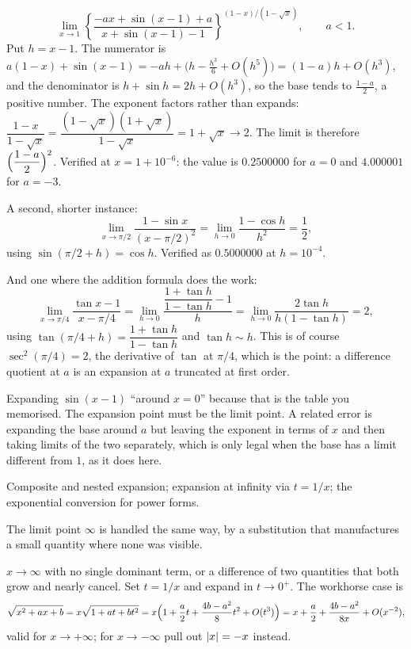 \begin{worked}
\[
\lim_{x\to1}\left\{\frac{-ax+\sin(x-1)+a}{x+\sin(x-1)-1}\right\}^{(1-x)/(1-\sqrt{x})},\qquad a<1 .
\]
Put $h=x-1$. The numerator is $a(1-x)+\sin(x-1)=-ah+\bigl(h-\tfrac{h^{3}}{6}+O(h^{5})\bigr)=(1-a)h+O(h^{3})$, and the denominator is $h+\sin h=2h+O(h^{3})$, so the base tends to $\tfrac{1-a}{2}$, a positive number. The exponent factors rather than expands: $\dfrac{1-x}{1-\sqrt x}=\dfrac{(1-\sqrt x)(1+\sqrt x)}{1-\sqrt x}=1+\sqrt x\to2$. The limit is therefore $\Bigl(\dfrac{1-a}{2}\Bigr)^{2}$. Verified at $x=1+10^{-6}$: the value is $0.2500000$ for $a=0$ and $4.000001$ for $a=-3$.

A second, shorter instance:
\[
\lim_{x\to\pi/2}\frac{1-\sin x}{(x-\pi/2)^{2}}=\lim_{h\to0}\frac{1-\cos h}{h^{2}}=\frac12 ,
\]
using $\sin(\pi/2+h)=\cos h$. Verified as $0.5000000$ at $h=10^{-4}$.

And one where the addition formula does the work:
\[
\lim_{x\to\pi/4}\frac{\tan x-1}{x-\pi/4}
=\lim_{h\to0}\frac{\dfrac{1+\tan h}{1-\tan h}-1}{h}
=\lim_{h\to0}\frac{2\tan h}{h(1-\tan h)}=2 ,
\]
using $\tan(\pi/4+h)=\dfrac{1+\tan h}{1-\tan h}$ and $\tan h\sim h$. This is of course $\sec^{2}(\pi/4)=2$, the derivative of $\tan$ at $\pi/4$, which is the point: a difference quotient at $a$ is an expansion at $a$ truncated at first order.
\end{worked}

\begin{trap}
Expanding $\sin(x-1)$ ``around $x=0$'' because that is the table you memorised. The expansion point must be the limit point. A related error is expanding the base around $a$ but leaving the exponent in terms of $x$ and then taking limits of the two separately, which is only legal when the base has a limit different from $1$, as it does here.
\end{trap}

\begin{seealsob}Composite and nested expansion; expansion at infinity via $t=1/x$; the exponential conversion for power forms.\end{seealsob}

The limit point $\infty$ is handled the same way, by a substitution that manufactures a small quantity where none was visible.

\cue $x\to\infty$ with no single dominant term, or a difference of two quantities that both grow and nearly cancel.
\method Set $t=1/x$ and expand in $t\to0^{+}$. The workhorse case is
\[
\sqrt{x^{2}+ax+b}=x\sqrt{1+at+bt^{2}}=x\Bigl(1+\frac{a}{2}t+\frac{4b-a^{2}}{8}t^{2}+O(t^{3})\Bigr)
=x+\frac{a}{2}+\frac{4b-a^{2}}{8x}+O(x^{-2}),
\]
valid for $x\to+\infty$; for $x\to-\infty$ pull out $\left\lvert x\right\rvert=-x$ instead.

